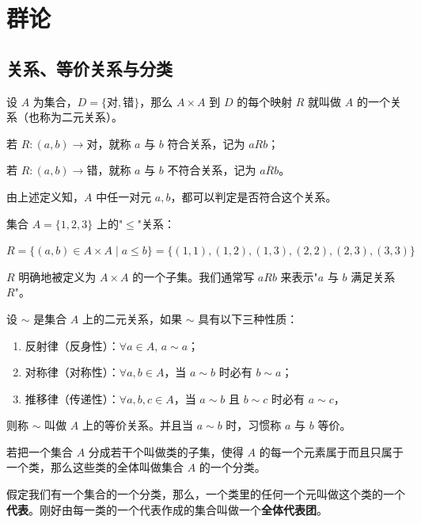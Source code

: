 \chapter{群论}

\section{关系、等价关系与分类}

\begin{definition}[二元关系]
设 $A$ 为集合，$D=\{\text{对},\text{错}\}$，那么 $A\times A$ 到 $D$ 的每个映射 $R$ 就叫做 $A$ 的一个关系（也称为二元关系）。

若 $R:(a,b)\to\text{对}$，就称 $a$ 与 $b$ 符合关系，记为 $aRb$；

若 $R:(a,b)\to\text{错}$，就称 $a$ 与 $b$ 不符合关系，记为 $a\overline{R}b$。

由上述定义知，$A$ 中任一对元 $a,b$，都可以判定是否符合这个关系。
\end{definition}

\begin{example}
集合 $A=\{1,2,3\}$ 上的"$\le$"关系：

$R=\{(a,b)\in A\times A\mid a\le b\}=\{(1,1),(1,2),(1,3),(2,2),(2,3),(3,3)\}$

$R$ 明确地被定义为 $A\times A$ 的一个子集。我们通常写 $aRb$ 来表示"$a$ 与 $b$ 满足关系 $R$"。
\end{example}

\begin{definition}[等价关系]
设 $\sim$ 是集合 $A$ 上的二元关系，如果 $\sim$ 具有以下三种性质：
\begin{enumerate}
  \item 反射律（反身性）：$\forall a\in A,\,a\sim a$；
  \item 对称律（对称性）：$\forall a,b\in A$，当 $a\sim b$ 时必有 $b\sim a$；
  \item 推移律（传递性）：$\forall a,b,c\in A$，当 $a\sim b$ 且 $b\sim c$ 时必有 $a\sim c$，
\end{enumerate}
则称 $\sim$ 叫做 $A$ 上的等价关系。并且当 $a\sim b$ 时，习惯称 $a$ 与 $b$ 等价。
\end{definition}

\begin{definition}[分类]
若把一个集合 $A$ 分成若干个叫做类的子集，使得 $A$ 的每一个元素属于而且只属于一个类，那么这些类的全体叫做集合 $A$ 的一个分类。

假定我们有一个集合的一个分类，那么，一个类里的任何一个元叫做这个类的一个\textbf{代表}。刚好由每一类的一个代表作成的集合叫做一个\textbf{全体代表团}。
\end{definition}

